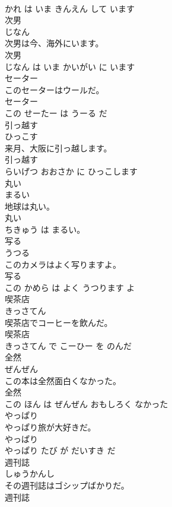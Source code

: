 \documentclass[8pt]{extreport}
\begin{document}
\begin{CJK}{UTF8}{min}
\\	かれ は いま きんえん して います			
\\	次男	
\\	じなん			
\\	次男は今、海外にいます。	
\\	次男 
\\	じなん は いま かいがい に います			
\\	セーター	
\\	このセーターはウールだ。	
\\	セーター 
\\	この せーたー は うーる だ			
\\	引っ越す	
\\	ひっこす			
\\	来月、大阪に引っ越します。	
\\	引っ越す 
\\	らいげつ おおさか に ひっこします			
\\	丸い	
\\	まるい			
\\	地球は丸い。	
\\	丸い 
\\	ちきゅう は まるい。			
\\	写る	
\\	うつる			
\\	このカメラはよく写りますよ。	
\\	写る 
\\	この かめら は よく うつります よ			
\\	喫茶店	
\\	きっさてん			
\\	喫茶店でコーヒーを飲んだ。	
\\	喫茶店 
\\	きっさてん で こーひー を のんだ			
\\	全然	
\\	ぜんぜん			
\\	この本は全然面白くなかった。	
\\	全然 
\\	この ほん は ぜんぜん おもしろく なかった			
\\	やっぱり	
\\	やっぱり旅が大好きだ。	
\\	やっぱり 
\\	やっぱり たび が だいすき だ			
\\	週刊誌	
\\	しゅうかんし			
\\	その週刊誌はゴシップばかりだ。	
\\	週刊誌 

\end{CJK}
\end{document}
